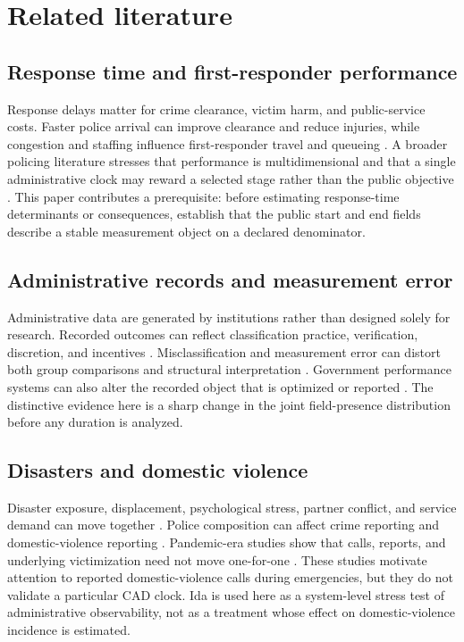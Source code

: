 \documentclass[11pt]{article}
\begin{document}
\section{Related literature}

\subsection{Response time and first-responder performance}

Response delays matter for crime clearance, victim harm, and public-service costs. Faster police arrival can improve clearance and reduce injuries, while congestion and staffing influence first-responder travel and queueing \citep{BlanesKirchmaier2018,DeAngeloTogerWeisburd2023,BrentBeland2020,MourtgosAdamsNix2024}. A broader policing literature stresses that performance is multidimensional and that a single administrative clock may reward a selected stage rather than the public objective \citep{MooreBraga2004,TiwanaBassFarrell2015,VerlaanRuiter2023}. This paper contributes a prerequisite: before estimating response-time determinants or consequences, establish that the public start and end fields describe a stable measurement object on a declared denominator.

\subsection{Administrative records and measurement error}

Administrative data are generated by institutions rather than designed solely for research. Recorded outcomes can reflect classification practice, verification, discretion, and incentives \citep{KlingerBridges1997,BoivinCordeau2011,BoivinOuellet2014,SimpsonOrosco2021}. Misclassification and measurement error can distort both group comparisons and structural interpretation \citep{KapteynYpma2007,ChenHongNekipelov2011,KnoxLoweMummolo2020}. Government performance systems can also alter the recorded object that is optimized or reported \citep{CourtyMarschke1997,Eckhouse2022}. The distinctive evidence here is a sharp change in the joint field-presence distribution before any duration is analyzed.

\subsection{Disasters and domestic violence}

Disaster exposure, displacement, psychological stress, partner conflict, and service demand can move together \citep{AnastarioShehabLawry2009,SchumacherEtAl2010,HarvilleTaylorTesfai2011,FirstEtAl2022}. Police composition can affect crime reporting and domestic-violence reporting \citep{MillerSegal2019}. Pandemic-era studies show that calls, reports, and underlying victimization need not move one-for-one \citep{LeslieWilson2020,BullingerCarrPackham2021,MillerSegalSpencer2022,MillerSegalSpencer2024}. These studies motivate attention to reported domestic-violence calls during emergencies, but they do not validate a particular CAD clock. Ida is used here as a system-level stress test of administrative observability, not as a treatment whose effect on domestic-violence incidence is estimated.
\end{document}
